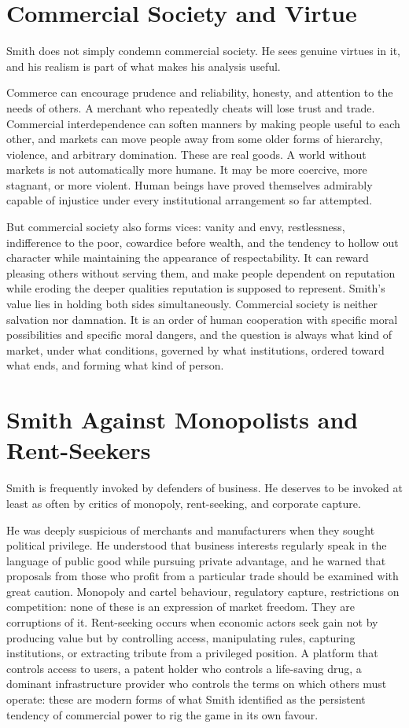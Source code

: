 \documentclass[11pt,a4paper,oneside]{book}
\begin{document}
\section*{Commercial Society and Virtue}

Smith does not simply condemn commercial society. He sees genuine virtues in it, and his realism is part of what makes his analysis useful.

Commerce can encourage prudence and reliability, honesty, and attention to the needs of others. A merchant who repeatedly cheats will lose trust and trade. Commercial interdependence can soften manners by making people useful to each other, and markets can move people away from some older forms of hierarchy, violence, and arbitrary domination. These are real goods. A world without markets is not automatically more humane. It may be more coercive, more stagnant, or more violent. Human beings have proved themselves admirably capable of injustice under every institutional arrangement so far attempted.

But commercial society also forms vices: vanity and envy, restlessness, indifference to the poor, cowardice before wealth, and the tendency to hollow out character while maintaining the appearance of respectability. It can reward pleasing others without serving them, and make people dependent on reputation while eroding the deeper qualities reputation is supposed to represent. Smith's value lies in holding both sides simultaneously. Commercial society is neither salvation nor damnation. It is an order of human cooperation with specific moral possibilities and specific moral dangers, and the question is always what kind of market, under what conditions, governed by what institutions, ordered toward what ends, and forming what kind of person.

\section*{Smith Against Monopolists and Rent-Seekers}

Smith is frequently invoked by defenders of business. He deserves to be invoked at least as often by critics of monopoly, rent-seeking, and corporate capture.

He was deeply suspicious of merchants and manufacturers when they sought political privilege. He understood that business interests regularly speak in the language of public good while pursuing private advantage, and he warned that proposals from those who profit from a particular trade should be examined with great caution. Monopoly and cartel behaviour, regulatory capture, restrictions on competition: none of these is an expression of market freedom. They are corruptions of it. Rent-seeking occurs when economic actors seek gain not by producing value but by controlling access, manipulating rules, capturing institutions, or extracting tribute from a privileged position. A platform that controls access to users, a patent holder who controls a life-saving drug, a dominant infrastructure provider who controls the terms on which others must operate: these are modern forms of what Smith identified as the persistent tendency of commercial power to rig the game in its own favour.
\end{document}
